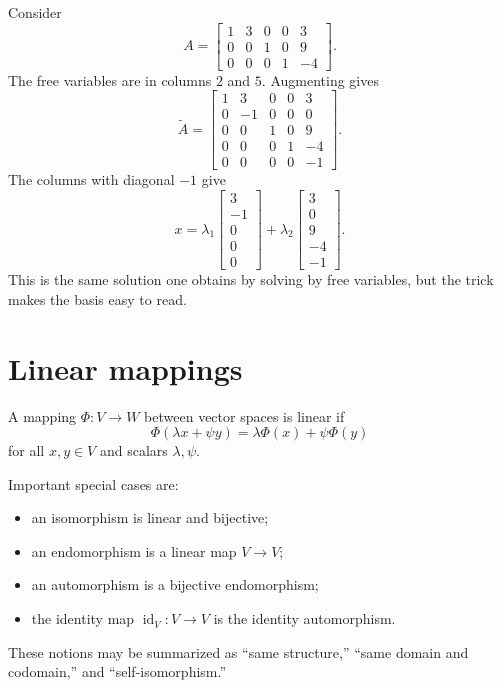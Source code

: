 Consider
\[
  A=
  \begin{bmatrix}
  1&3&0&0&3\\
  0&0&1&0&9\\
  0&0&0&1&-4
  \end{bmatrix}.
\]
The free variables are in columns $2$ and $5$.  Augmenting gives
\[
  \widetilde A=
  \begin{bmatrix}
  1&3&0&0&3\\
  0&-1&0&0&0\\
  0&0&1&0&9\\
  0&0&0&1&-4\\
  0&0&0&0&-1
  \end{bmatrix}.
\]
The columns with diagonal $-1$ give
\[
  x=\lambda_1
  \begin{bmatrix}3\\-1\\0\\0\\0\end{bmatrix}
  +\lambda_2
  \begin{bmatrix}3\\0\\9\\-4\\-1\end{bmatrix}.
\]
This is the same solution one obtains by solving by free variables, but the trick makes the basis easy to read.

\section{Linear mappings}

A mapping $\Phi:V\to W$ between vector spaces is linear if
\[
  \Phi(\lambda x+\psi y)=\lambda \Phi(x)+\psi \Phi(y)
\]
for all $x,y\in V$ and scalars $\lambda,\psi$.

Important special cases are:
\begin{itemize}
  \item an isomorphism is linear and bijective;
  \item an endomorphism is a linear map $V\to V$;
  \item an automorphism is a bijective endomorphism;
  \item the identity map $\operatorname{id}_V:V\to V$ is the identity automorphism.
\end{itemize}

These notions may be summarized as “same structure,” “same domain and codomain,” and “self-isomorphism.”

